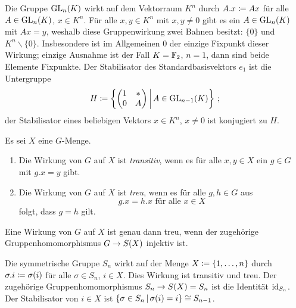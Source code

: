 \begin{example}
  Die Gruppe $\operatorname{GL}_{n}(K)$ wirkt auf dem Vektorraum $K^n$ durch $A.x \coloneqq Ax$ für alle $A \in \operatorname{GL}_{n}(K)$, $x \in K^n$.
  Für alle $x, y \in K^n$ mit $x, y \neq 0$ gibt es ein $A \in \operatorname{GL}_{n}(K)$ mit $Ax = y$, weshalb diese Gruppenwirkung zwei Bahnen besitzt:
  $\{0\}$ und $K^n \smallsetminus \{0\}$.
  Insbesondere ist im Allgemeinen $0$ der einzige Fixpunkt dieser Wirkung;
  einzige Ausnahme ist der Fall $K = \mathbb{F}_2$, $n = 1$, dann sind beide Elemente Fixpunkte.
  Der Stabilisator des Standardbasisvektors $e_1$ ist die Untergruppe
  \[
              H
    \defined  \left\{
                \begin{pmatrix}
                  1 & * \\
                  0 & A
                \end{pmatrix}
              \suchthat*
                A \in \GL{n-1}{K}
              \right\} \,;
  \]
  der Stabilisator eines beliebigen Vektors $x \in K^n$, $x \neq 0$ ist konjugiert zu $H$.
\end{example}

\begin{definition}
  Es sei $X$ eine $G$-Menge.
  \begin{enumerate}
    \item
      Die Wirkung von $G$ auf $X$ ist \emph{transitiv}, wenn es für alle $x, y \in X$ ein $g \in G$ mit $g.x = y$ gibt.
    \item
      Die Wirkung von $G$ auf $X$ ist \emph{treu}, wenn es für alle $g, h \in G$ aus
      \[
        \text{$g.x = h.x$ für alle $x \in X$}
      \]
      folgt, dass $g = h$ gilt.
  \end{enumerate}
\end{definition}

\begin{remark}
  Eine Wirkung von $G$ auf $X$ ist genau dann treu, wenn der zugehörige Gruppenhomomorphismus $G \to S(X)$ injektiv ist.
\end{remark}

\begin{example}
  Die symmetrische Gruppe $S_n$ wirkt auf der Menge $X \coloneqq \{1, \dotsc, n\}$ durch $\sigma.i \coloneqq \sigma(i)$ für alle $\sigma \in S_n$, $i \in X$.
  Dies Wirkung ist transitiv und treu.
  Der zugehörige Gruppenhomomorphismus $S_n \to S(X) = S_n$ ist die Identität $\operatorname{id}_{S_n}$.
  Der Stabilisator von $i \in X$ ist $\{ \sigma \in S_n \suchthat \sigma(i) = i \} \cong S_{n-1}$.
\end{example}

